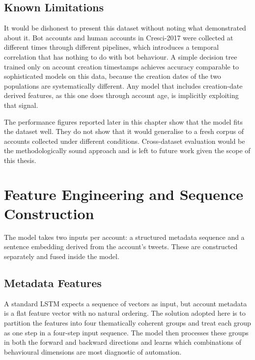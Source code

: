 \subsection{Known Limitations}
\label{subsec:cresci_limits}

It would be dishonest to present this dataset without noting what
\citet{HSR+23} demonstrated about it. Bot accounts and human accounts in
Cresci-2017 were collected at different times through different pipelines,
which introduces a temporal correlation that has nothing to do with bot
behaviour. A simple decision tree trained only on account creation timestamps
achieves accuracy comparable to sophisticated models on this data, because
the creation dates of the two populations are systematically different. Any
model that includes creation-date derived features, as this one does through
account age, is implicitly exploiting that signal.

The performance figures reported later in this chapter show that the model
fits the dataset well. They do not show that it would generalise to a fresh
corpus of accounts collected under different conditions. Cross-dataset
evaluation would be the methodologically sound approach and is left to future
work given the scope of this thesis.

\section{Feature Engineering and Sequence Construction}
\label{sec:features}

The model takes two inputs per account: a structured metadata sequence and
a sentence embedding derived from the account's tweets. These are constructed
separately and fused inside the model.

\subsection{Metadata Features}

A standard LSTM expects a sequence of vectors as input, but account metadata
is a flat feature vector with no natural ordering. The solution adopted here
is to partition the features into four thematically coherent groups and treat
each group as one step in a four-step input sequence. The model then processes
these groups in both the forward and backward directions and learns which
combinations of behavioural dimensions are most diagnostic of automation.

